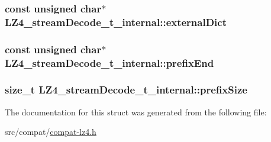 \subsubsection[{external\+Dict}]{\setlength{\rightskip}{0pt plus 5cm}const unsigned char$\ast$ L\+Z4\+\_\+stream\+Decode\+\_\+t\+\_\+internal\+::external\+Dict}\label{struct_l_z4__stream_decode__t__internal_ac0aa66d825ef7783c0e361d62ee96b94}
\hypertarget{struct_l_z4__stream_decode__t__internal_ad606d5eb3b0f267e29c7caa2ec965c23}{}
\subsubsection[{prefix\+End}]{\setlength{\rightskip}{0pt plus 5cm}const unsigned char$\ast$ L\+Z4\+\_\+stream\+Decode\+\_\+t\+\_\+internal\+::prefix\+End}\label{struct_l_z4__stream_decode__t__internal_ad606d5eb3b0f267e29c7caa2ec965c23}
\hypertarget{struct_l_z4__stream_decode__t__internal_a44f5f7acc14c2bb3865eccd5372107c4}{}
\subsubsection[{prefix\+Size}]{\setlength{\rightskip}{0pt plus 5cm}size\+\_\+t L\+Z4\+\_\+stream\+Decode\+\_\+t\+\_\+internal\+::prefix\+Size}\label{struct_l_z4__stream_decode__t__internal_a44f5f7acc14c2bb3865eccd5372107c4}


The documentation for this struct was generated from the following file\+:\begin{DoxyCompactItemize}
\item 
src/compat/\hyperlink{compat-lz4_8h}{compat-\/lz4.\+h}\end{DoxyCompactItemize}
